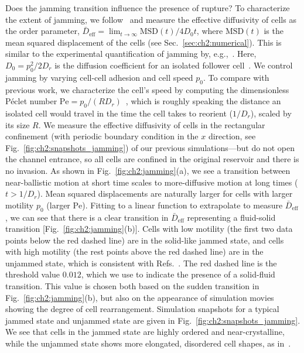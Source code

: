Does the jamming transition influence the presence of rupture?
To characterize the extent of jamming, we follow~\cite{loewe2020solid} and measure the effective diffusivity of cells as the order parameter, $\bar{D}_{\text{eff}}=\lim_{t\to \infty} \mathrm{MSD}(t)/4D_0 t$, where $\textrm{MSD}(t)$ is the mean squared displacement of the cells (see Sec.~\ref{sec:ch2:numerical}).
This is similar to the experimental quantification of jamming by, e.g.,~\cite{park2015unjamming}.
Here, $D_0=p_0^2/2D_r$ is the diffusion coefficient for an isolated follower cell~\cite{loewe2020solid, bi2016motility}.
We control jamming by varying cell-cell adhesion and cell speed $p_0$.
To compare with previous work, we characterize the cell's speed by computing the dimensionless P\'{e}clet number $\mathrm{Pe} = p_0 /(R D_r)$~\cite{loewe2020solid}, which is roughly speaking the distance an isolated cell would travel in the time the cell takes to reorient ($1/D_r$), scaled by its size $R$.
We measure the effective diffusivity of cells in the rectangular confinement (with periodic boundary condition in the $x$ direction, see Fig.~\ref{fig:ch2:snapshots_jamming}) of our previous simulations---but do not open the channel entrance, so all cells are confined in the original reservoir and there is no invasion.
As shown in Fig.~\ref{fig:ch2:jamming}(a), we see a transition between near-ballistic motion at short time scales to more-diffusive motion at long times ($t > 1/D_r$).
Mean squared displacements are naturally larger for cells with larger motility $p_0$ (larger $\mathrm{Pe}$).
Fitting to a linear function to extrapolate to measure $\bar{D}_{\text{eff}}$, we can see that there is a clear transition in $\bar{D}_{\text{eff}}$ representing a fluid-solid transition [Fig.~\ref{fig:ch2:jamming}(b)].
Cells with low motility (the first two data points below the red dashed line) are in the solid-like jammed state, and cells with high motility (the rest points above the red dashed line) are in the unjammed state, which is consistent with Refs.~\cite{loewe2020solid, bi2016motility}.
The red dashed line is the threshold value $0.012$, which we use to indicate the presence of a solid-fluid transition.
This value is chosen both based on the sudden transition in Fig.~\ref{fig:ch2:jamming}(b), but also on the appearance of simulation movies showing the degree of cell rearrangement.
Simulation snapshots for a typical jammed state and unjammed state are given in Fig.~\ref{fig:ch2:snapshots_jamming}.
We see that cells in the jammed state are highly ordered and near-crystalline, while the unjammed state shows more elongated, disordered cell shapes, as in~\cite{loewe2020solid}.

